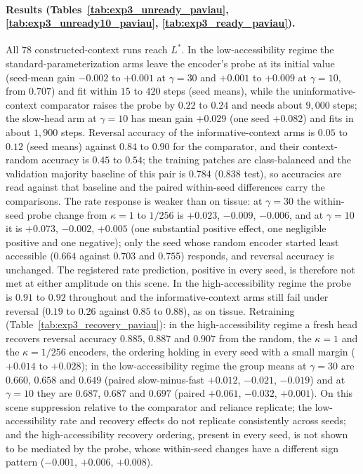 \paragraph{Results (Tables~\ref{tab:exp3_unready_paviau}, \ref{tab:exp3_unready10_paviau},
\ref{tab:exp3_ready_paviau}).} All $78$ constructed-context runs reach $L^\ast$. In the
low-accessibility regime the standard-parameterization arms leave the encoder's probe
at its initial value (seed-mean gain $-0.002$ to $+0.001$ at $\gamma=30$ and $+0.001$
to $+0.009$ at $\gamma=10$, from $0.707$) and fit within $15$ to $420$ steps (seed
means), while the uninformative-context comparator raises the probe by $0.22$ to $0.24$
and needs about $9{,}000$ steps; the slow-head arm at $\gamma=10$ has mean gain
$+0.029$ (one seed $+0.082$) and fits in about $1{,}900$ steps. Reversal accuracy of
the informative-context arms is $0.05$ to $0.12$ (seed means) against $0.84$ to $0.90$
for the comparator, and their context-random accuracy is $0.45$ to $0.54$; the training
patches are class-balanced and the validation majority baseline of this pair is
$0.784$ ($0.838$ test), so accuracies are read against that baseline and the paired
within-seed differences carry the comparisons. The rate response is weaker than on
tissue: at $\gamma=30$ the within-seed probe change from $\kappa=1$ to $1/256$ is
$+0.023$, $-0.009$, $-0.006$, and at $\gamma=10$ it is $+0.073$, $-0.002$, $+0.005$ (one
substantial positive effect, one negligible positive and one negative); only the seed
whose random encoder started least accessible ($0.664$ against $0.703$ and $0.755$)
responds, and reversal accuracy is unchanged. The registered rate prediction, positive
in every seed, is therefore not met at either amplitude on this scene. In the
high-accessibility regime the probe is $0.91$ to $0.92$ throughout and the
informative-context arms still fail under reversal ($0.19$ to $0.26$ against $0.85$ to
$0.88$), as on tissue. Retraining (Table~\ref{tab:exp3_recovery_paviau}): in the
high-accessibility regime a fresh head recovers reversal accuracy $0.885$, $0.887$ and
$0.907$ from the random, the $\kappa=1$ and the $\kappa=1/256$ encoders, the ordering
holding in every seed with a small margin ($+0.014$ to $+0.028$); in the
low-accessibility regime the group means at $\gamma=30$ are $0.660$, $0.658$ and
$0.649$ (paired slow-minus-fast $+0.012$, $-0.021$, $-0.019$) and at $\gamma=10$ they are
$0.687$, $0.687$ and $0.697$ (paired $+0.061$, $-0.032$, $+0.001$). On this scene
suppression relative to the comparator and reliance replicate; the low-accessibility
rate and recovery effects do not replicate consistently across seeds; and the
high-accessibility recovery ordering, present in every seed, is not shown to be
mediated by the probe, whose within-seed changes have a different sign pattern
($-0.001$, $+0.006$, $+0.008$).

